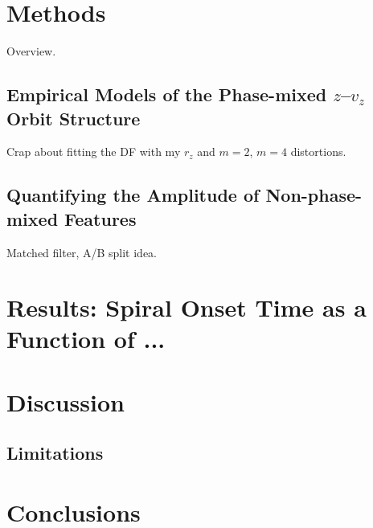 
\section{Methods} \label{sec:methods}

Overview.

\subsection{Empirical Models of the Phase-mixed $z$--$v_z$ Orbit Structure}
\label{sec:zvz-structure}

Crap about fitting the DF with my $r_z$ and $m=2$, $m=4$ distortions.


\subsection{Quantifying the Amplitude of Non-phase-mixed Features}
\label{sec:residuals}

Matched filter, A/B split idea.


\section{Results: Spiral Onset Time as a Function of ...}
\label{sec:results}


\section{Discussion} \label{sec:discussion}

\subsection{Limitations}
\label{sec:limitations}


\section{Conclusions} \label{sec:conclusions}


